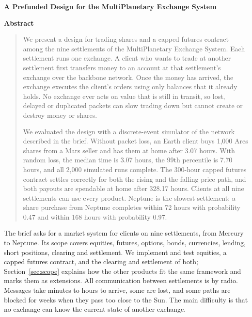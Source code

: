 \documentclass[10pt,letterpaper]{article}
\makeatletter
\renewcommand\section{\@startsection{section}{1}{\z@}{-9pt plus -2pt minus -1pt}{3pt}{\normalfont\large\bfseries}}
\makeatother
\begin{document}
\begin{center}{\LARGE\bfseries A Prefunded Design for the MultiPlanetary Exchange System\par}\vspace{3pt}{\normalsize Design paper \quad$\cdot$\quad Milestone 2 \quad$\cdot$\quad Design v3\par}\end{center}
\begin{center}\textbf{Abstract}\end{center}\vspace{-6pt}\begin{quote}

We present a design for trading shares and a capped futures contract among the nine settlements of the
MultiPlanetary Exchange System. Each settlement runs one exchange. A client who wants to trade at another settlement
first transfers money to an account at that settlement's exchange over the backbone network. Once the money has
arrived, the exchange executes the client's orders using only balances that it already holds. No exchange ever acts
on value that is still in transit, so lost, delayed or duplicated packets can slow trading down but cannot create
or destroy money or shares.

We evaluated the design with a discrete-event simulator of the network described in the brief. Without packet loss, an
Earth client buys 1,000 Ares shares from a Mars seller and has them at home after 3.07 hours. With
random loss, the median time is 3.07 hours, the 99th percentile is 7.70 hours,
and all 2,000 simulated runs complete. The 300-hour capped futures contract settles correctly for
both the rising and the falling price path, and both payouts are spendable at home after 328.17 hours.
Clients at all nine settlements can use every product. Neptune is the slowest settlement: a share purchase from
Neptune completes within 72 hours with probability 0.47 and within 168 hours with
probability 0.97.
\end{quote}

\section{Introduction}
The brief asks for a market system for clients on nine settlements, from Mercury to Neptune. Its scope covers
equities, futures, options, bonds, currencies, lending, short positions, clearing and settlement. We implement and test
equities, a capped futures contract, and the clearing and settlement of both; Section~\ref{sec:scope} explains how the
other products fit the same framework and marks them as extensions. All communication between settlements is by radio. Messages take minutes to
hours to arrive, some are lost, and some paths are blocked for weeks when they pass too close to the Sun. The main
difficulty is that no exchange can know the current state of another exchange.
\end{document}
